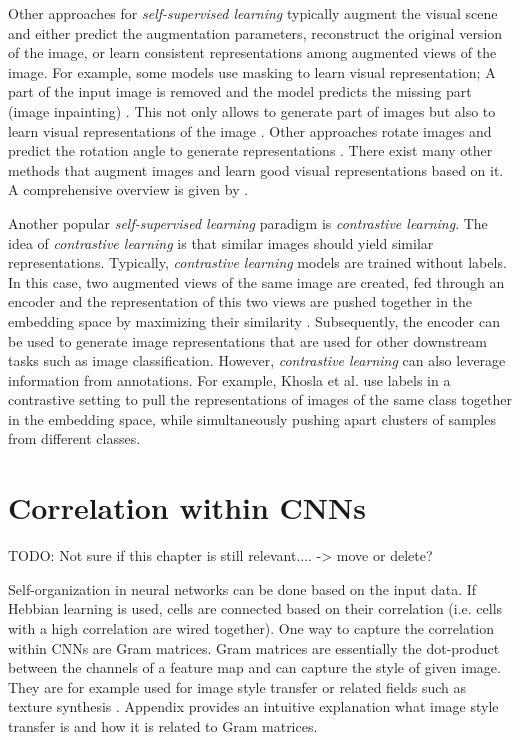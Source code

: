 Other approaches for \emph{self-supervised learning} typically augment the visual scene and either predict the augmentation parameters, reconstruct the original version of the image, or learn consistent representations among augmented views of the image.
For example, some models use masking to learn visual representation;
A part of the input image is removed and the model predicts the missing part (image inpainting) \cite{Elharrouss_Almaadeed_Al-Maadeed_Akbari_2020}.
This not only allows to generate part of images but also to learn visual representations of the image .
Other approaches rotate images and predict the rotation angle to generate representations .
There exist many other methods that augment images and learn good visual representations based on it.
A comprehensive overview is given by .

Another popular \emph{self-supervised learning} paradigm is \emph{contrastive learning}.
The idea of \emph{contrastive learning} is that similar images should yield similar representations.
Typically, \emph{contrastive learning} models are trained without labels.
In this case, two augmented views of the same image are created, fed through an encoder and the representation of this two views are pushed together in the embedding space by maximizing their similarity .
Subsequently, the encoder can be used to generate image representations that are used for other downstream tasks such as image classification.
However, \emph{contrastive learning} can also leverage information from annotations.
For example, Khosla et al.  use labels in a contrastive setting to pull the representations of images of the same class together in the embedding space, while simultaneously pushing apart clusters of samples from different classes.


\section{Correlation within CNNs}

TODO: Not sure if this chapter is still relevant.... -> move or delete?

Self-organization in neural networks can be done based on the input data.
If Hebbian learning is used, cells are connected based on their correlation (i.e. cells with a high correlation are wired together).
One way to capture the correlation within CNNs are Gram matrices.
Gram matrices are essentially the dot-product between the channels of a feature map and can capture the style of given image.
They are for example used for image style transfer or related fields such as texture synthesis .
Appendix  provides an intuitive explanation what image style transfer is and how it is related to Gram matrices.

